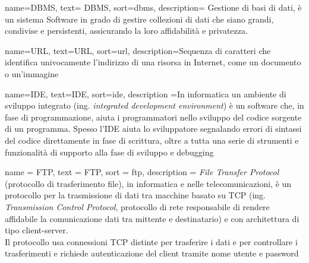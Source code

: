 
\label{cap:glossario}

    
%


{
	name={DBMS},
	text= DBMS,
	sort=dbms,
	description= {Gestione di basi di dati, è un sistema Software in grado di gestire collezioni di dati che siano grandi, condivise e persistenti, assicurando la loro affidabilità e privatezza.}
}

{
	name={URL},
    text=URL,
    sort=url,
    description={Sequenza di caratteri che identifica univocamente l'indirizzo di una risorsa in Internet, come un documento o un'immagine}
}

{
	name={IDE},
	text=IDE,
	sort=ide,
	description ={In informatica un ambiente di sviluppo integrato (ing. \textit{integrated development environment}) è un software che, in fase di programmazione, aiuta i programmatori nello sviluppo del codice sorgente di un programma. Spesso l'IDE aiuta lo sviluppatore segnalando errori di sintassi del codice direttamente in fase di scrittura, oltre a tutta una serie di strumenti e funzionalità di supporto alla fase di sviluppo e debugging}
}

{
	name = FTP,
	text = FTP,
	sort = ftp,
	description = {\textit{File Transfer Protocol} (protocollo di trasferimento file), in informatica e nelle telecomunicazioni, è un protocollo per la trasmissione di dati tra macchine basato su TCP (ing. \textit{Transmission Control Protocol}, protocollo di rete responsabile di rendere affidabile la comunicazione dati tra mittente e destinatario) e con architettura di tipo client-server.\\
Il protocollo usa connessioni TCP distinte per trasferire i dati e per controllare i trasferimenti e richiede autenticazione del client tramite nome utente e password}
}

